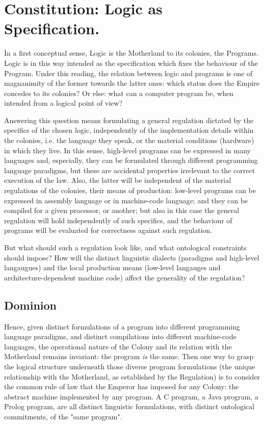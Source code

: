 \documentclass[]{article}
\begin{document}
\section{Constitution: Logic as Specification.}

In a first conceptual sense, Logic is the Motherland to its colonies, the Programs. Logic is in this way intended as the specification which fixes the behaviour of the Program. Under this reading, the relation between logic and programs is one of magnanimity of the former towards the latter ones: which status does the Empire concedes to its colonies? Or else: what can a computer program be, when intended from a logical point of view?

Answering this question means formulating a general regulation dictated by the specifics of the chosen logic, independently of the implementation details within  the colonies, i.e. the language they speak, or the material conditions (hardware) in which they live. In this sense, high-level programs can be expressed in many languages and, especially, they can be formulated through different programming language paradigms, but these are accidental properties irrelevant to the correct execution of the law. Also, the latter will be independent of the material regulations of the colonies, their means of production: low-level programs can be expressed in assembly language or in machine-code language; and they can be compiled for a given processor, or another; but also in this case the general regulation will hold independently of such specifics, and the behaviour of programs will be evaluated for correctness against such regulation.

But what should such a regulation look like, and what ontological constraints should impose? How will the distinct linguistic dialects (paradigms and high-level langaugues) and the local production means (low-level langauges and architecture-dependent machine code) affect the generality of the regulation?




\subsection{Dominion}


{\color{red}{this passage is inspired by Nicola's note}}

Hence, given distinct formulations of a program into different programming language paradigms, and distinct compilations into different machine-code languages, the operational nature of the Colony and its relation with the Motherland remains invariant: the program \textit{is} the same.  Then one way to grasp the logical structure underneath those diverse program formulations (the unique relationship with the Motherland, as established by the Regulation) is to consider the common rule of law that the Emperor has imposed for any Colony: the abstract machine implemented by any program. A C program, a Java program, a Prolog program, are all distinct linguistic formulations, with distinct ontological commitments, of the "same program".
\end{document}
